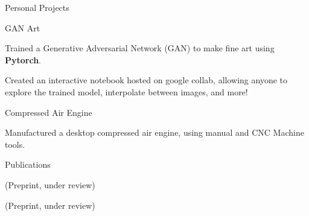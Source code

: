 \documentclass{resume} %
\begin{document}
\begin{rSection}{Personal Projects}
\begin{rSubsection}{GAN Art}{}{}{} 
\item \vspace{-4mm} Trained a Generative Adversarial Network (GAN) to make fine art using \textbf{Pytorch}. 
\item Created an interactive notebook hosted on google collab, allowing anyone to explore the trained model, interpolate between images, and more!
\end{rSubsection}


\begin{rSubsection}{Compressed Air Engine}{ }{}{}
\item Manufactured a desktop compressed air engine, using manual and CNC Machine tools.
\end{rSubsection}

\end{rSection}



\begin{rSection}{Publications}


\item {} (Preprint, under review)
\item {} (Preprint, under review)
\item {}
\item {}
\item {}

\end{rSection}


\end{document}
